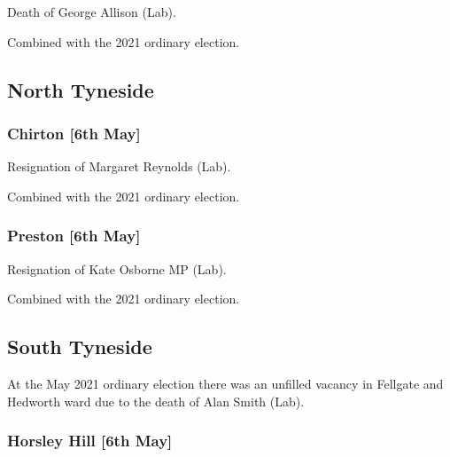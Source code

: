 \documentclass[a4paper,openany]{book}
\begin{document}
\begin{resultsiii}

Death of George Allison (Lab).

Combined with the 2021 ordinary election.

\subsection*{North Tyneside}

\subsubsection*{Chirton \hspace*{\fill}\nolinebreak[1]%
	\enspace\hspace*{\fill}
	[6th May]}


Resignation of Margaret Reynolds (Lab).

Combined with the 2021 ordinary election.

\subsubsection*{Preston \hspace*{\fill}\nolinebreak[1]%
	\enspace\hspace*{\fill}
	[6th May]}


Resignation of Kate Osborne MP (Lab).

Combined with the 2021 ordinary election.

\subsection*{South Tyneside}

At the May 2021 ordinary election there was an unfilled vacancy in Fellgate and Hedworth ward due to the death of Alan Smith (Lab).

\subsubsection*{Horsley Hill \hspace*{\fill}\nolinebreak[1]%
	\enspace\hspace*{\fill}
	[6th May]}


\end{resultsiii}
\end{document}

